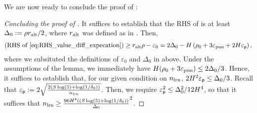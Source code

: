 We are now ready to conclude the proof of :
\begin{proof}[Concluding the proof of ] It suffices to establish that the RHS of  is at least $\Delta_0 := \rho r_{\mathrm{alt}}/2$, where  $r_{\mathrm{alt}}$ was defined as in . Then,
\begin{align*}
\text{(RHS of \Cref{eq:RHS_value_diff_expecation})} \ge \ralt \rho -  \varepsilon_0 = 2\Delta_0 - H \left(\rho_0 + 3\epspunish  + 2H\epsp\right),
\end{align*}
where we subsituted the definitions of $\varepsilon_0$ and $\Delta_0$ in above. Under the assumptions of the lemma, we immediately have $H (\rho_0 + 3\varepsilon_{\mathrm{pun}}) \le 2\Delta_0/3$. Hence, it suffices to establish that, for our given condition on $n_{\mathrm{lrn}}$, $2H^2\varepsilon_{\mathsf{p}} \le \Delta_0/3$. Recall that $\varepsilon_{\mathsf{p}}:= 2\sqrt{ \frac{2(S\log(5) + \log(1/\delta_0))}{n_{\mathrm{lrn}}}}$. Then, we require $\varepsilon_{\mathsf{p}}^2 \le \Delta_0^2/12 H^4$, so that it suffices that $n_{\mathrm{lrn}} \ge \frac{96 H^4((S\log(5) + \log(1/\delta_0))}{\Delta_0}^2$.
\end{proof}

